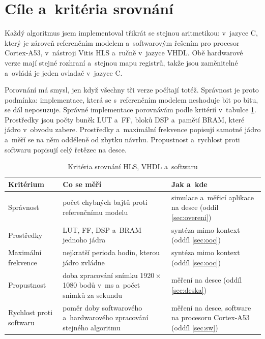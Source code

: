 \documentclass[FM,DP]{tulthesis}
\begin{document}
\section{Cíle a~kritéria srovnání}
\label{sec:kriteria}

Každý algoritmus jsem implementoval třikrát se stejnou aritmetikou: v~jazyce C,
který je zároveň referenčním modelem a~softwarovým řešením pro procesor
Cortex-A53, v~nástroji Vitis \ac{HLS} a~ručně v~jazyce VHDL. Obě hardwarové
verze mají stejné rozhraní a~stejnou mapu registrů, takže jsou zaměnitelné
a~ovládá je jeden ovladač v~jazyce C.

Porovnání má smysl, jen když všechny tři verze počítají totéž. Správnost je
proto podmínka: implementace, která se s~referenčním modelem neshoduje bit po
bitu, se dál neposuzuje. Správné implementace porovnávám podle kritérií
v~tabulce \ref{tab:kriteria}. Prostředky jsou počty buněk \ac{LUT} a~\ac{FF},
bloků \ac{DSP} a~pamětí \ac{BRAM}, které jádro v~obvodu zabere. Prostředky
a~maximální frekvence popisují samotné jádro a~měří se na něm odděleně od
zbytku návrhu. Propustnost a~rychlost proti softwaru popisují celý řetězec na
desce.

\begin{table}[htbp]
    \centering
    \caption{Kritéria srovnání HLS, VHDL a~softwaru}
    \label{tab:kriteria}
    \begin{tabular}{p{3.3cm}p{5.2cm}p{5.2cm}}
        \toprule
        Kritérium               & Co se měří                                                               & Jak a~kde                                                              \\
        \midrule
        Správnost               & počet chybných bajtů proti referenčnímu modelu                           & simulace a~měřicí aplikace na desce (oddíl \ref{sec:overeni})          \\
        Prostředky              & \acs{LUT}, \acs{FF}, \acs{DSP} a~\acs{BRAM} jednoho jádra                & syntéza mimo kontext (oddíl \ref{sec:ooc})                             \\
        Maximální frekvence     & nejkratší perioda hodin, kterou jádro zvládne                            & syntéza mimo kontext (oddíl \ref{sec:ooc})                             \\
        Propustnost             & doba zpracování snímku 1920\,×\,1080 bodů v~ms a~počet snímků za sekundu & měření na desce (oddíl \ref{sec:deska})                                \\
        Rychlost proti softwaru & poměr doby softwarového a~hardwarového zpracování stejného algoritmu     & měření na desce, software na procesoru Cortex-A53 (oddíl \ref{sec:sw}) \\
        \bottomrule
    \end{tabular}
\end{table}
\end{document}
